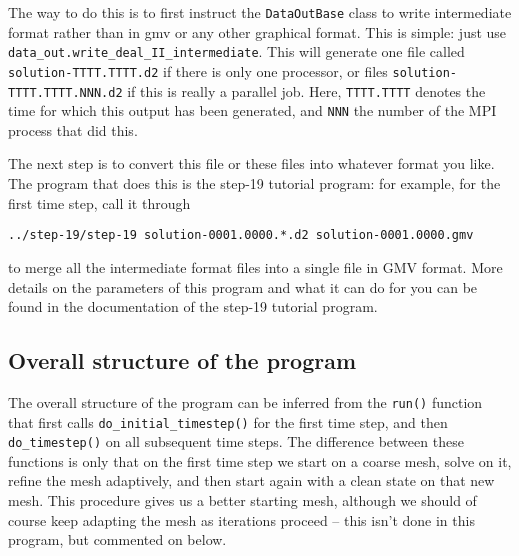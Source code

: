 \documentclass{article}
\begin{document}
The way to do this is to first instruct the \texttt{DataOutBase} class to
write intermediate format rather than in gmv or any other graphical
format. This is simple: just use
\texttt{data\_out.write\_deal\_II\_intermediate}. This will generate one file
called \texttt{solution-TTTT.TTTT.d2} if there is only one processor, or
files \texttt{solution-TTTT.TTTT.NNN.d2} if this is really a parallel
job. Here, \texttt{TTTT.TTTT} denotes the time for which this output has
been generated, and \texttt{NNN} the number of the MPI process that did this.

The next step is to convert this file or these files into whatever
format you like. The program that does this is the step-19 tutorial program:
for example, for the first time step, call it through
\begin{center}
  \texttt{../step-19/step-19 solution-0001.0000.*.d2 solution-0001.0000.gmv}
\end{center}
to merge all the intermediate format files into a single file in GMV
format. More details on the parameters of this program and what it can do for
you can be found in the documentation of the step-19 tutorial program.



\subsection*{Overall structure of the program}

The overall structure of the program can be inferred from the \texttt{run()}
function that first calls \texttt{do\_initial\_timestep()} for the first time
step, and then \texttt{do\_timestep()} on all subsequent time steps. The
difference between these functions is only that on the first time step we
start on a coarse mesh, solve on it, refine the mesh adaptively, and then
start again with a clean state on that new mesh. This procedure gives us a
better starting mesh, although we should of course keep adapting the mesh as
iterations proceed -- this isn't done in this program, but commented on below.
\end{document}
